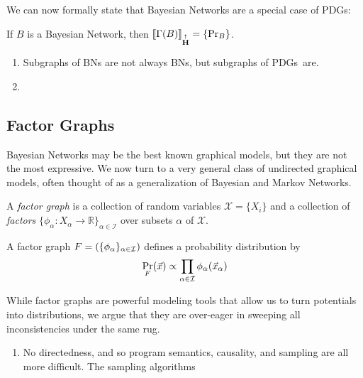 \documentclass{article}
\newcommand\MaxEnt{{\overset{\uparrow}{\mathbf H}}}
\newcommand{\MN}{PDG}
\newcommand{\MNs}{\MN s}
\begin{document}
	We can now formally state that Bayesian Networks are a special case of \MNs: 
	\begin{theorem}
		If $B$ is a Bayesian Network, then $\bbr{\Gamma(B)}_\MaxEnt =\{\Pr_B\}$.
	\end{theorem}

	\begin{fact}
		\begin{enumerate}
			\item Subgraphs of BNs are not always BNs, but subgraphs of \MNs\ are.
			\item 
		\end{enumerate}
	\end{fact}
	
	\subsection{Factor Graphs} \label{sec:factor-graphs}
	
	Bayesian Networks may be the best known graphical models, but they are not the most expressive. We now turn to a very general class of undirected graphical models, often thought of as a generalization of Bayesian and Markov Networks.
	\begin{defn}
		A \emph{factor graph} is a collection of random variables $\mathcal X = \{X_i\}$ and a collection of \emph{factors} $\{\phi_\alpha\colon X_\alpha \to \mathbb R\}_{\alpha \in \mathcal I }$ over subsets $\alpha$ of $\mathcal X$.
	\end{defn}

	A factor graph $F = (\{\phi_\alpha\}_{\alpha \in \cal I})$ defines a probability distribution by 
	\[ \Pr_F(\vec x) \propto \prod_{\alpha \in \cal I} \phi_\alpha(\vec x_{\alpha}) \]

	While factor graphs are powerful modeling tools that allow us to turn potentials into distributions, we argue that they are over-eager in sweeping all inconsistencies under the same rug. 
	\begin{enumerate}
		\item No directedness, and so program semantics, causality, and sampling are all more difficult. The sampling algorithms
	\end{enumerate}
	
\end{document}
